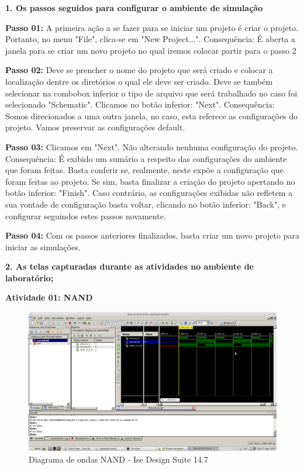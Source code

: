 \documentclass[12pts]{article}
\begin{document}
\textbf{1. Os passos seguidos para configurar o ambiente de simulação}

\singlespacing

\textbf{Passo 01:} A primeira ação a se fazer para se iniciar um projeto é criar o projeto. Portanto, no menu "File", clica-se em "New Project...". 
Consequência: É aberta a janela para se criar um novo projeto no qual iremos colocar partir para o passo 2
\singlespacing

\textbf{Passo 02:} Deve se prencher o nome do projeto que será criado e colocar a localização dentre os diretórios o qual ele deve ser criado. Deve se também selecionar na combobox inferior o tipo de arquivo que será trabalhado no caso foi selecionado "Schematic". Clicamos no botão inferior: "Next".
Consequência: Somos direcionados a uma outra janela, no caso, esta referece as configurações do projeto. Vamos preservar as configurações default.
\singlespacing

\textbf{Passo 03:} Clicamos em "Next". Não alterando nenhuma configuração do projeto. 
Consequência: É exibido um sumário a respeito das configurações do ambiente que foram feitas. Basta conferir se, realmente, neste expõe a configuração que foram feitas ao projeto. Se sim, basta finalizar a criação do projeto apertando no botão inferior: "Finish". Caso contrário, as configurações exibidas não refletem a sua vontade de configuração basta voltar, clicando no botão inferior: "Back", e configurar seguindos estes passos novamente. 
\singlespacing

\textbf{Passo 04:} Com os passos anteriores finalizados, basta criar um novo projeto para iniciar as simulações.
\singlespacing

\newpage
\textbf{2. As telas capturadas durante as atividades no ambiente de laboratório;}
\singlespacing

\textbf{Atividade 01: NAND}

\begin{figure}[!htb]
  \centering
  \includegraphics[scale=0.3]{Atividade01}
  \caption{Diagrama de ondas NAND - Ise Design Suite 14.7}
  \label{figRotulo}
\end{figure}
\end{document}
